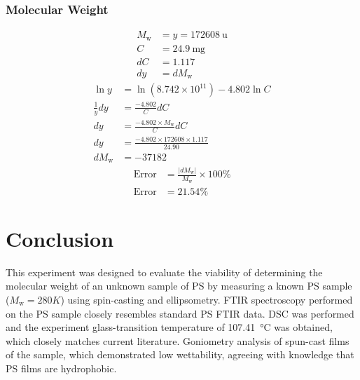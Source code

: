 \documentclass[twocolumn]{article}
\begin{document}
                \subsubsection{Molecular Weight}
                    \begin{align}
                        M_\text{w} &= y = \qty{172608}{\atomicmassunit} \nonumber\\
                        C &= \qty{24.9}{\milli\gram} \nonumber\\
                        dC &= 1.117 \nonumber\\
                        dy &= dM_\text{w} \nonumber
                    \end{align}
                    \begin{align}
                        \ln y &= \ln{(8.742 \times 10^{11})} - 4.802 \ln{C}\\
                        \frac{1}{y}dy &= \frac{-4.802}{C}dC \nonumber\\
                        dy &= \frac{-4.802 \times M_\text{w}}{C}dC \nonumber\\
                        dy &= \frac{-4.802 \times 172608 \times 1.117}{24.90} \nonumber\\
                        dM_\text{w} &= - 37182 \nonumber
                    \end{align}
                    \begin{align}
                        \text{Error} &= \frac{|dM_\text{w}|}{M_\text{w}} \times 100\%\\
                        \text{Error} &= 21.54\% \nonumber
                    \end{align}

        \section{Conclusion}
            This experiment was designed to evaluate the viability of determining the molecular weight of an unknown sample of PS by measuring a known PS sample ($M_\text{w} = 280K$) using spin-casting and ellipsometry. FTIR spectroscopy performed on the PS sample closely resembles standard PS FTIR data. DSC was performed and the experiment glass-transition temperature of \qty{107.41}{\degreeCelsius} was obtained, which closely matches current literature. Goniometry analysis of spun-cast films of the sample, which demonstrated low wettability, agreeing with knowledge that PS films are hydrophobic.
\end{document}
